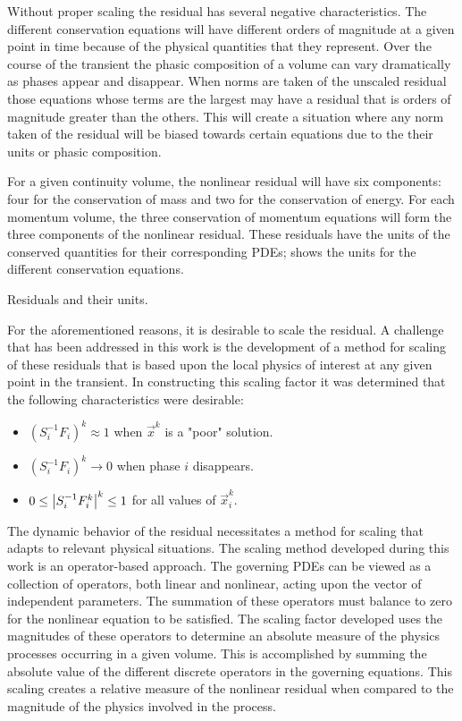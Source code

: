 Without proper scaling the residual has several negative characteristics.
The different conservation equations will have different orders of magnitude at a given point in time because of the physical quantities that they represent.
Over the course of the transient the phasic composition of a volume can vary dramatically as phases appear and disappear.
When norms are taken of the unscaled residual those equations whose terms are the largest may have a residual that is orders of magnitude greater than the others.
This will create a situation where any norm taken of the residual will be biased towards certain equations due to the their units or phasic composition.

For a given continuity volume, the nonlinear residual will have six components: four for the conservation of mass and two for the conservation of energy.
For each momentum volume, the three conservation of momentum equations will form the three components of the nonlinear residual.
These residuals have the units of the conserved quantities for their corresponding PDEs;  shows the units for the different conservation equations.

\begin{table}[ht]
\centering

\caption{Residuals and their units.}
\label{tab:scaling_units_scales}
\end{table}

For the aforementioned reasons, it is desirable to scale the residual.
A challenge that has been addressed in this work is the development of a method for scaling of these residuals that is based upon the local physics of interest at any given point in the transient.
In constructing this scaling factor it was determined that the following characteristics were desirable:

\begin{itemize}
\item{$(S_{i}^{-1} F_i)^{k} \approx 1$ when $\vec{x}^{k}$ is a "poor" solution.}
\item{$(S_{i}^{-1} F_i)^{k} \rightarrow 0$ when phase $i$ disappears.}
\item{$0 \leq \left|S_{i}^{-1} F^{k}_{i}\right|^{k} \leq 1 $ for all values of $\vec{x}^{k}_i$.}
\end{itemize}

The dynamic behavior of the residual necessitates a method for scaling that adapts to relevant physical situations.
The scaling method developed during this work is an operator-based approach.
The governing PDEs can be viewed as a collection of operators, both linear and nonlinear, acting upon the vector of independent parameters.
The summation of these operators must balance to zero for the nonlinear equation to be satisfied.
The scaling factor developed uses the magnitudes of these operators to determine an absolute measure of the physics processes occurring in a given volume.
This is accomplished by summing the absolute value of the different discrete operators in the governing equations.
This scaling creates a relative measure of the nonlinear residual when compared to the magnitude of the physics involved in the process.

